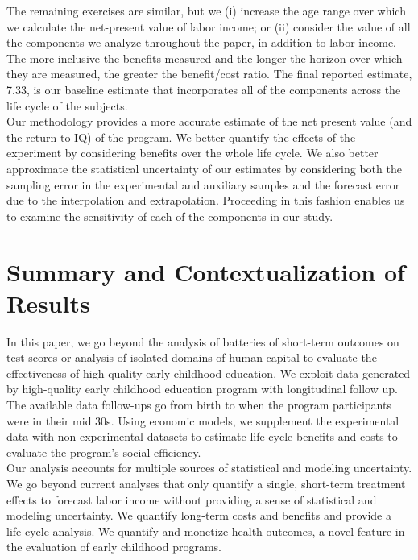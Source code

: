 \noindent The remaining exercises are similar, but we (i) increase the age range over which we calculate the net-present value of labor income; or (ii) consider the value of all the components we analyze throughout the paper, in addition to labor income. The more inclusive the benefits measured and the longer the horizon over which they are measured, the greater the benefit/cost ratio. The final reported estimate, 7.33, is our baseline estimate that incorporates all of the components across the life cycle of the subjects.\\

\noindent Our methodology provides a more accurate estimate of the net present value (and the return to IQ) of the program. We better quantify the effects of the experiment by considering benefits over the whole life cycle. We also better approximate the statistical uncertainty of our estimates by considering both the sampling error in the experimental and auxiliary samples and the forecast error due to the interpolation and extrapolation. Proceeding in this fashion enables us to examine the sensitivity of each of the components in our study.

\section{Summary and Contextualization of Results} \label{section:conclusion}

In this paper, we go beyond the analysis of batteries of short-term outcomes on test scores or analysis of isolated domains of human capital to evaluate the effectiveness of high-quality early childhood education. We exploit data generated by high-quality early childhood education program with longitudinal follow up. The available data follow-ups go from birth to when the program participants were in their mid 30s. Using economic models, we supplement the experimental data with non-experimental datasets to estimate life-cycle benefits and costs to evaluate the program's social efficiency.\\

\noindent Our analysis accounts for multiple sources of statistical and modeling uncertainty. We go beyond current analyses that only quantify a single, short-term treatment effects to forecast labor income without providing a sense of statistical and modeling uncertainty. We quantify long-term costs and benefits and provide a life-cycle analysis. We quantify and monetize health outcomes, a novel feature in the evaluation of early childhood programs.\\

